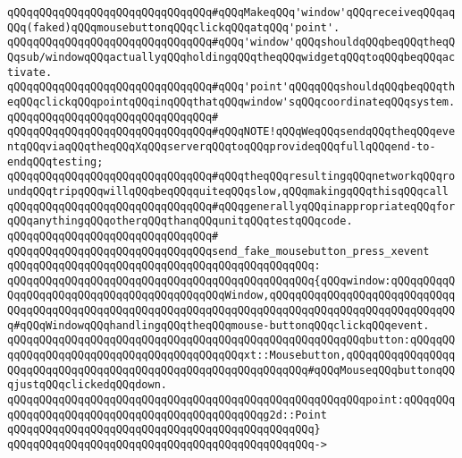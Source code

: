 \newline
\verb|qQQqqQQqqQQqqQQqqQQqqQQqqQQqqQQq#qQQqMakeqQQq'window'qQQqreceiveqQQqaqQQq(faked)qQQqmousebuttonqQQqclickqQQqatqQQq'point'.|\newline
\verb|qQQqqQQqqQQqqQQqqQQqqQQqqQQqqQQq#qQQq'window'qQQqshouldqQQqbeqQQqtheqQQqsub/windowqQQqactuallyqQQqholdingqQQqtheqQQqwidgetqQQqtoqQQqbeqQQqactivate.|\newline
\verb|qQQqqQQqqQQqqQQqqQQqqQQqqQQqqQQq#qQQq'point'qQQqqQQqshouldqQQqbeqQQqtheqQQqclickqQQqpointqQQqinqQQqthatqQQqwindow'sqQQqcoordinateqQQqsystem.|\newline
\verb|qQQqqQQqqQQqqQQqqQQqqQQqqQQqqQQq#|\newline
\verb|qQQqqQQqqQQqqQQqqQQqqQQqqQQqqQQq#qQQqNOTE!qQQqWeqQQqsendqQQqtheqQQqeventqQQqviaqQQqtheqQQqXqQQqserverqQQqtoqQQqprovideqQQqfullqQQqend-to-endqQQqtesting;|\newline
\verb|qQQqqQQqqQQqqQQqqQQqqQQqqQQqqQQq#qQQqtheqQQqresultingqQQqnetworkqQQqroundqQQqtripqQQqwillqQQqbeqQQqquiteqQQqslow,qQQqmakingqQQqthisqQQqcall|\newline
\verb|qQQqqQQqqQQqqQQqqQQqqQQqqQQqqQQq#qQQqgenerallyqQQqinappropriateqQQqforqQQqanythingqQQqotherqQQqthanqQQqunitqQQqtestqQQqcode.|\newline
\verb|qQQqqQQqqQQqqQQqqQQqqQQqqQQqqQQq#|\newline
\verb|qQQqqQQqqQQqqQQqqQQqqQQqqQQqqQQqsend_fake_mousebutton_press_xevent|\newline
\verb|qQQqqQQqqQQqqQQqqQQqqQQqqQQqqQQqqQQqqQQqqQQqqQQq:|\newline
\verb|qQQqqQQqqQQqqQQqqQQqqQQqqQQqqQQqqQQqqQQqqQQqqQQq{qQQqwindow:qQQqqQQqqQQqqQQqqQQqqQQqqQQqqQQqqQQqqQQqqQQqWindow,qQQqqQQqqQQqqQQqqQQqqQQqqQQqqQQqqQQqqQQqqQQqqQQqqQQqqQQqqQQqqQQqqQQqqQQqqQQqqQQqqQQqqQQqqQQqqQQqqQQq#qQQqWindowqQQqhandlingqQQqtheqQQqmouse-buttonqQQqclickqQQqevent.|\newline
\verb|qQQqqQQqqQQqqQQqqQQqqQQqqQQqqQQqqQQqqQQqqQQqqQQqqQQqqQQqbutton:qQQqqQQqqQQqqQQqqQQqqQQqqQQqqQQqqQQqqQQqqQQqxt::Mousebutton,qQQqqQQqqQQqqQQqqQQqqQQqqQQqqQQqqQQqqQQqqQQqqQQqqQQqqQQqqQQqqQQq#qQQqMouseqQQqbuttonqQQqjustqQQqclickedqQQqdown.|\newline
\verb|qQQqqQQqqQQqqQQqqQQqqQQqqQQqqQQqqQQqqQQqqQQqqQQqqQQqqQQqpoint:qQQqqQQqqQQqqQQqqQQqqQQqqQQqqQQqqQQqqQQqqQQqqQQqg2d::Point|\newline
\verb|qQQqqQQqqQQqqQQqqQQqqQQqqQQqqQQqqQQqqQQqqQQqqQQq}|\newline
\verb|qQQqqQQqqQQqqQQqqQQqqQQqqQQqqQQqqQQqqQQqqQQqqQQq->|\newline
